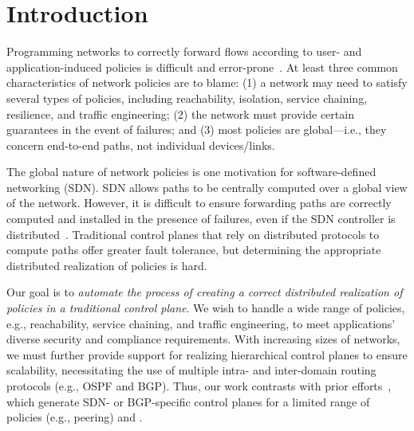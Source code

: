 \section{Introduction}
Programming networks to correctly forward flows according to user- and
application-induced policies is difficult and
error-prone~\cite{troubleshooting, bgpmisconfig}. At least three
common characteristics of network policies are to blame: (1) a network
may need to satisfy several types of policies, including reachability,
isolation, service chaining, resilience, and traffic engineering; (2)
the network must provide certain guarantees in the event of failures;
and (3) most policies are global---i.e., they concern end-to-end
paths, not individual devices/links.


The global nature of network policies is one motivation for
software-defined networking (SDN). SDN allows paths to be centrally
computed over a global view of the network. However, it is difficult
to ensure forwarding paths are correctly computed and installed in the
presence of failures, even if the SDN controller is
distributed~\cite{hasdn}.  Traditional control planes that rely on
distributed protocols to compute paths offer greater fault tolerance,
but determining the appropriate distributed realization of policies is
hard.




Our goal is to {\em automate the process of creating a correct
  distributed realization of policies in a traditional control
  plane}. We wish to handle a wide range of policies, e.g.,
reachability, service chaining, and traffic engineering, to meet
applications' diverse security and compliance requirements. 
With
increasing sizes of networks, we must further provide support for
realizing hierarchical control planes to ensure scalability,
necessitating the use of multiple intra- and inter-domain routing
protocols (e.g., OSPF and BGP). 
Thus, our work contrasts with prior efforts~\cite{netegg,
  propane, merlin,simple,fattire, netkat, netkatcompiler, sol}, which
generate SDN- or BGP-specific control planes for a limited range of
policies (e.g., peering) and .

